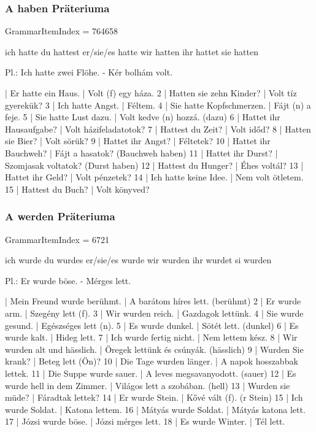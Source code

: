 \documentclass{article}
\newenvironment{desc}{\verbatim}{\endverbatim}
\newenvironment{exmp}{\verbatim}{\endverbatim}
\begin{document}
\subsubsection{A haben Präteriuma}

GrammarItemIndex = 764658

\begin{desc}
ich hatte
du hattest
er/sie/es hatte
wir hatten
ihr hattet
sie hatten

Pl.: Ich hatte zwei Flöhe. - Kér bolhám volt.
\end{desc}

\begin{exmp}
1 | Er hatte ein Haus. | Volt (f) egy háza.
2 | Hatten sie zehn Kinder? | Volt tíz gyerekük?
3 | Ich hatte Angst. | Féltem.
4 | Sie hatte Kopfschmerzen. | Fájt (n) a feje.
5 | Sie hatte Lust dazu. | Volt kedve (n) hozzá. (dazu)
6 | Hattet ihr Hausaufgabe? | Volt házifeladatotok?
7 | Hattest du Zeit? | Volt időd?
8 | Hatten sie Bier? | Volt sörük?
9 | Hattet ihr Angst? | Féltetek?
10 | Hattet ihr Bauchweh? | Fájt a hasatok? (Bauchweh haben)
11 | Hattet ihr Durst? | Szomjasak voltatok? (Durst haben)
12 | Hattest du Hunger? | Éhes voltál?
13 | Hattet ihr Geld? | Volt pénzetek?
14 | Ich hatte keine Idee. | Nem volt ötletem.
15 | Hattest du Buch? | Volt könyved?
\end{exmp}

\subsubsection{A werden Präteriuma}

GrammarItemIndex = 6721

\begin{desc}
ich wurde
du wurdes
er/sie/es wurde
wir wurden
ihr wurdet
si wurden

Pl.: Er wurde böse. - Mérges lett.
\end{desc}

\begin{exmp}
1 | Mein Freund wurde berühmt. | A barátom híres lett. (berühmt)
2 | Er wurde arm. | Szegény lett (f).
3 | Wir wurden reich. | Gazdagok lettünk.
4 | Sie wurde gesund. | Egészséges lett (n).
5 | Es wurde dunkel. | Sötét lett. (dunkel)
6 | Es wurde kalt. | Hideg lett.
7 | Ich wurde fertig nicht. | Nem lettem kész.
8 | Wir wurden alt und hässlich. | Öregek lettünk és csúnyák. (hässlich)
9 | Wurden Sie krank? | Beteg lett (Ön)?
10 | Die Tage wurden länger. | A napok hosszabbak lettek.
11 | Die Suppe wurde sauer. | A leves megsavanyodott. (sauer)
12 | Es wurde hell in dem Zimmer. | Világos lett a szobában. (hell)
13 | Wurden sie müde? | Fáradtak lettek?
14 | Er wurde Stein. | Kővé vált (f). (r Stein)
15 | Ich wurde Soldat. | Katona lettem.
16 | Mátyás wurde Soldat. | Mátyás katona lett.
17 | Józsi wurde böse. | Józsi mérges lett.
18 | Es wurde Winter. | Tél lett.
\end{exmp}
\end{document}
